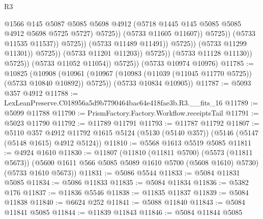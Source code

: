 \begin{lexlean}{R3}
\begin{coremodule}
                                                  @1566
                                                  @145
                                                  @5087
                                                  @5085
                                                  @5698
                                                  @4912
                                                  (@5718
                                                    @1445
                                                    @145
                                                    @5085
                                                    @5085
                                                    @4912
                                                    @5698
                                                    @5725
                                                    @5727)
                                                  @5725))
                                              (@5733 @11605 @11607))
                                            @5725))
                                        (@5733 @11535 @11537))
                                      @5725))
                                  (@5733 @11489 @11491))
                                @5725))
                            (@5733 @11299 @11301))
                          @5725))
                      (@5733 @11201 @11203))
                    @5725))
                (@5733 @11128 @11130))
              @5725))
          (@5733 @11052 @11054))
        @5725))
    (@5733 @10974 @10976)
@11785 := @10825
    (@10908
      (@10961 (@10967 (@10983 (@11039 (@11045 @11770 @5725)) (@5733 @10840 @10892)) @5725))
      (@5733 @10834 @10905))
@11787 := @5093 @357 @4912
@11788 := LexLeanPreserve.C018956a5d9b7790464bac64e418fae3b.R3.__fits_16
@11789 := @5099 @11788
@11790 := PrismFactory.Factory.Workflow.receiptsTail
@11791 := @5023 @11790
@11792 := @11789 @11791
@11793 := @11787 @11792
@11807 := @5110
    @357
    @4912
    @11792
    @1615
    @5124
    (@5130 (@5140 @357))
    (@5146 (@5147 (@5148 @1615) @4912 @5124))
@11810 := @5568 @1613 @5519 @5085
@11811 := @4924 @1610
@11830 := @11807
    (@11810
      (@11811 @5700)
      (@5573 (@11811 @5673))
      (@5600 @1611 @566 @5085 @5089 @1610 @5700 (@5608 @1610) @5730)
      (@5733 @1610 @5673))
@11831 := @5086 @5544
@11833 := @5084 @11831 @5085
@11834 := @5086 @11833
@11835 := @5084 @11834
@11836 := @5382 @176
@11837 := @11836 @5546
@11838 := @11835 @11837
@11839 := @5084 @11838
@11840 := @6624 @252
@11841 := @5088 @11840
@11843 := @5084 @11841 @5085
@11844 := @11839 @11843
@11846 := @5084 @11844 @5085

\end{coremodule}
\end{lexlean}
